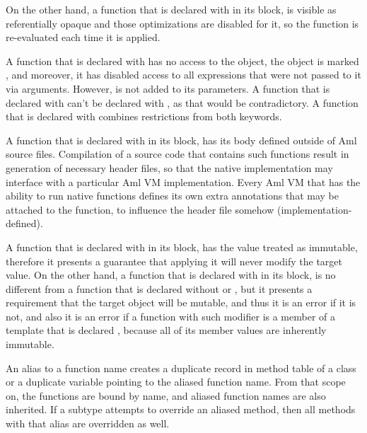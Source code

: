 On the other hand, a function that is declared with  in its  block, is visible as referentially opaque and those optimizations are disabled for it, so the function is re-evaluated each time it is applied. 

A function that is declared with  has no access to the  object, the  object is marked , and moreover, it has disabled access to all expressions that were not passed to it via arguments. However,  is not added to its parameters. A function that is declared with  can't be declared with , as that would be contradictory. A function that is declared with  combines restrictions from both keywords. 

A function that is declared with  in its  block, has its body defined outside of Aml source files. Compilation of a source code that contains such functions result in generation of necessary header files, so that the native implementation may interface with a particular Aml VM implementation. Every Aml VM that has the ability to run native functions defines its own extra annotations that may be attached to the function, to influence the header file somehow (implementation-defined). 

A function that is declared with  in its  block, has the  value treated as immutable, therefore it presents a guarantee that applying it will never modify the target value. On the other hand, a function that is declared with  in its  block, is no different from a function that is declared without  or , but it presents a requirement that the target object will be mutable, and thus it is an error if it is not, and also it is an error if a function with such modifier is a member of a template that is declared , because all of its member values are inherently immutable. 

An alias to a function name creates a duplicate record in method table of a class or a duplicate variable pointing to the aliased function name. From that scope on, the functions are bound by name, and aliased function names are also inherited. If a subtype attempts to override an aliased method, then all methods with that alias are overridden as well. 

